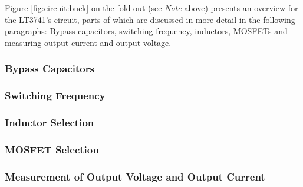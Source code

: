 Figure \ref{fig:circuit:buck} on the fold-out (see \emph{Note} above) presents
an overview  for the LT3741's  circuit, parts of  which are discussed  in more
detail in  the following paragraphs:  Bypass  capacitors, switching frequency,
inductors, MOSFETs and measuring output current and output voltage.


\subsubsection{Bypass Capacitors}



\subsubsection{Switching Frequency}



\subsubsection{Inductor Selection}
\label{subsubsec:lt3741:inductors}



\subsubsection{MOSFET Selection}
\label{subsubsec:lt3741:mosfets}



\subsubsection{Measurement of Output Voltage and Output Current}
\label{subsubsec:lt3741:feedback}

